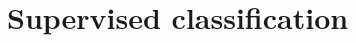 \documentclass[preprint]{aastex}
\newcommand{\figlabel}[1]{\label{fig:#1}}
\begin{document}

\appendix

\section{Supervised classification}


\clearpage

\clearpage


\end{document}
